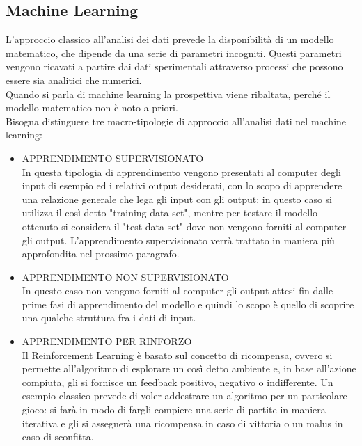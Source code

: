 \newpage
	
\subsection{Machine Learning}
\label{subsec:machine learning}
	L'approccio classico all'analisi dei dati prevede la disponibilità di un modello matematico, che dipende da una serie di parametri incogniti. Questi parametri vengono ricavati a partire dai dati sperimentali attraverso processi che possono essere sia analitici che numerici. \\
	Quando si parla di machine learning la prospettiva viene ribaltata, perché il modello matematico non è noto a priori. \\
	Bisogna distinguere tre macro-tipologie di approccio all'analisi dati nel machine learning:
	\begin{itemize}
		\item APPRENDIMENTO SUPERVISIONATO \\
			In questa tipologia di apprendimento vengono presentati al computer degli input di esempio ed i relativi output desiderati, con lo scopo di apprendere una relazione generale che lega gli input con gli output; in questo caso si utilizza il così detto "training data set", mentre per testare il modello ottenuto si considera il "test data set" dove non vengono forniti al computer gli output. L'apprendimento supervisionato verrà trattato in maniera più approfondita nel prossimo paragrafo.
		\item APPRENDIMENTO NON SUPERVISIONATO \\
			In questo caso non vengono forniti al computer gli output attesi fin dalle prime fasi di apprendimento del modello e quindi lo scopo è quello di scoprire una qualche struttura fra i dati di input.
		\item APPRENDIMENTO PER RINFORZO \\
			Il Reinforcement Learning è basato sul concetto di ricompensa, ovvero si permette all'algoritmo di esplorare un così detto ambiente e, in base all'azione compiuta, gli si fornisce un feedback positivo, negativo o indifferente. Un esempio classico prevede di voler addestrare un algoritmo per un particolare gioco: si farà in modo di fargli compiere una serie di partite in maniera iterativa e gli si assegnerà una ricompensa in caso di vittoria o un malus in caso di sconfitta. \\ 
	\end{itemize}

